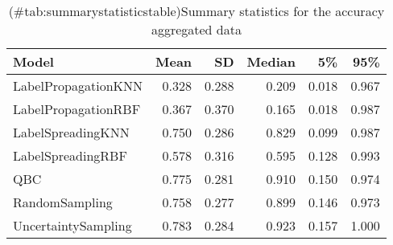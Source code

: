 \begin{table}[!h]

\caption{(\#tab:summarystatisticstable)Summary statistics for the accuracy aggregated data}
\centering
\begin{tabular}[t]{lrrrrr}
\toprule
Model & Mean & SD & Median & 5\% & 95\%\\
\midrule
LabelPropagationKNN & 0.328 & 0.288 & 0.209 & 0.018 & 0.967\\
LabelPropagationRBF & 0.367 & 0.370 & 0.165 & 0.018 & 0.987\\
LabelSpreadingKNN & 0.750 & 0.286 & 0.829 & 0.099 & 0.987\\
LabelSpreadingRBF & 0.578 & 0.316 & 0.595 & 0.128 & 0.993\\
QBC & 0.775 & 0.281 & 0.910 & 0.150 & 0.974\\
RandomSampling & 0.758 & 0.277 & 0.899 & 0.146 & 0.973\\
UncertaintySampling & 0.783 & 0.284 & 0.923 & 0.157 & 1.000\\
\bottomrule
\end{tabular}
\end{table}
